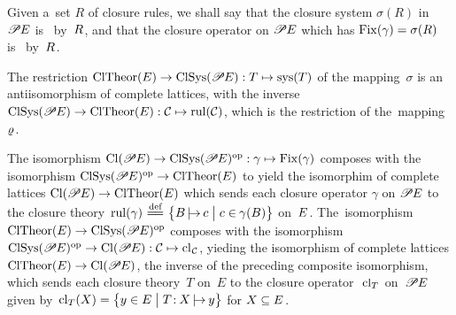 \documentclass[11pt,letterpaper]{article}
\begin{document}
Given a~set $R$ of closure rules,
we shall say that the closure system $\sigma(R)$ in~$\PowE$ is~ by~$R\tinysp$,
and that the closure operator on $\PowE$ which has $\Fix(\gamma)=\sigma(R)$
	is~ by~$R\tinysp$.

The restriction $\ClTheor(E)\to\ClSys(\PowE) : T \mapsto \sys(T)$ of the mapping~$\sigma$
	is an antiisomorphism of complete lattices,
with the inverse $\ClSys(\PowE)\to\ClTheor(E) : \coll{C}\mapsto\rul(\coll{C})$,
		which is the restriction of the~mapping~$\varrho\tinysp$.

The isomorphism $\Cl(\PowE) \to \ClSys(\PowE)^\op : \gamma \mapsto \Fix(\gamma)$
composes with the isomorphism $\ClSys(\PowE)^\op \to \ClTheor(E)$
to yield the isomorphim of complete lattices $\Cl(\PowE) \to \ClTheor(E)$
which sends each closure operator $\gamma$ on $\PowE$
to the closure theory
	$\dtinysp\rul(\gamma)
	    \defeq \bigset{B\negdtinysp\adjoins{}c\bigsuchthat c\in\negtinysp\gamma(B)}$
		on~$E\tinysp$.
The~isomorphism $\ClTheor(E) \to \ClSys(\PowE)^\op$
composes with the isomorphism
	$\ClSys(\PowE)^\op \to \Cl(\PowE) : \coll{C}\mapsto\cl_{\tinysp\coll{C}}$,
yieding the isomorphism of complete lattices $\ClTheor(E) \to \Cl(\PowE)$,
the inverse of the preceding composite isomorphism,
which sends each closure theory~$T$ on~$E$ to the closure operator~$\widedt{\cl_T}$ on~$\PowE$
given by $\dtinysp\cl_T(X)
		= \bigset{y\in E\bigsuchthat T\colon\narrdt X\adjoins{}y}$ for $X\subseteq E\tinysp$.

\begin{comment}
The closure system $\ClSys(\PowE)$ in $\PowPowE$
	is the fixpoint set of the closure operator~$\sigma\negdtinysp\varrho\tinysp$,
so~that $\sigma\negdtinysp\varrho(\coll{X}) = \clsys(\coll{X})$ for every $\coll{X}\subseteq\PowE\tinysp$.
There is also the closure operator $\varrho\tinysp\sigma$ on~$\Pow\negtinysp\ClTheor(E)$
which for each $R\subseteq\ClRul(E)$ yields the closure theory~$\widedt{\der(R)}$~on~$E\dtinysp$;
the rules in $\widedt{\der(R)}$ are said to be \notion{derived} from the rules~in~$R\tinysp$.
The identity $\sigma\negdtinysp\varrho\tinysp\sigma = \sigma$
	satisfied by the Galois connection $\pair{\sigma,\varrho}$
has the following interpretation:
if $R$ is any~set of closure rules on~$E\tinysp$,
	then $\sigma\bigl(\varrho\tinysp\sigma(R)\bigr) = \sigma(R)$
means that a~subset of $E$ obeys the set of rules~$R$
	\iff\ it obeys the closure theory $\der(R) = \varrho\tinysp\sigma(R)\tinysp$.
\end{comment}
\end{document}
